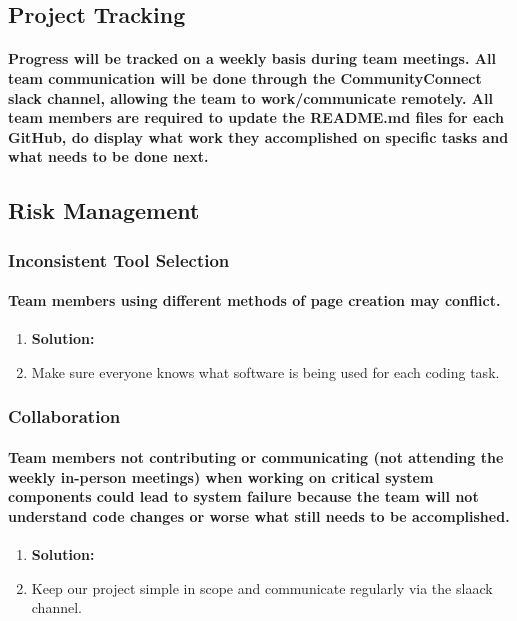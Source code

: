 \documentclass[12pt]{article}
\begin{document}
	\subsection{\bf Project Tracking}
		\paragraph{\normalfont \indent Progress will be tracked on a weekly basis during team meetings. All team communication will be done through the CommunityConnect slack channel, allowing the team to work/communicate remotely. All team members are required to update the README.md files for each GitHub, do display what work they accomplished on specific tasks and what needs to be done next.
    }

	\subsection{\bf Risk Management}
		\subsubsection{\bf Inconsistent Tool Selection }
			\paragraph{\normalfont Team members using different methods of page creation may conflict.}
			\begin{enumerate}
				\item \bf Solution:
				\item Make sure everyone knows what software is being used for each coding task.
			\end{enumerate}
		\subsubsection{\bf Collaboration}
		\paragraph{\normalfont Team members not contributing or communicating (not attending the weekly in-person meetings) when working on critical system components could lead to system failure because the team will not understand code changes or worse what still needs to be accomplished.}
			\begin{enumerate}
				\item \bf Solution:
				\item Keep our project simple in scope and communicate regularly via the slaack channel.
			\end{enumerate}
\end{document}
